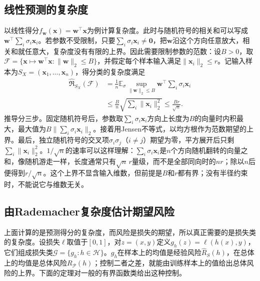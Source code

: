 \subsection{线性预测的复杂度}

以线性得分$f_{\bm w}(\bm x)=\bm w^\top\bm x$为例计算复杂度。此时与随机符号的相关和可以写成$\bm w^\top\sum_i\sigma_i\bm x_i$。若参数不受限制，只要$\sum_i\sigma_i\bm x_i\neq\bm 0$，把$\bm w$沿这个方向任意放大，相关和就任意大，复杂度没有有限的上界。因此需要限制参数的范数：设$B>0$，取$\mathcal F=\{\bm x\mapsto\bm w^\top\bm x:\|\bm w\|_2\leq B\}$，并假定每个样本输入满足$\|\bm x_i\|_2\leq r$。记输入样本为$S_X=(\bm x_1,\ldots,\bm x_n)$，得分类的复杂度满足
\begin{align}
 \widehat{\mathfrak R}_{S_X}(\mathcal F)
 &=\frac1n\mathbb E_\sigma\sup_{\lVert\bm{w}\rVert_2\leq B}
   \bm{w}^\top\sum_i\sigma_i \bm{x}_i\nonumber\\
 &\leq\frac{B}{n}\sqrt{\sum_i\lVert\bm{x}_i\rVert_2^2}
 \leq\frac{Br}{\sqrt n}.
 \label{eq:linear-rademacher-bound}
\end{align}
推导分三步。固定随机符号后，参数取$\sum_i\sigma_i\bm x_i$方向上长度为$B$的向量时内积最大，最大值为$B\|\sum_i\sigma_i\bm x_i\|_2$。接着用Jensen不等式，以均方根作为范数期望的上界。最后，独立随机符号的交叉项$\sigma_i\sigma_j$（$i\neq j$）期望为零，平方展开后只剩$\sum_i\|\bm x_i\|_2^2$。$1/\sqrt n$的速率可以这样理解：$\sum_i\sigma_i\bm x_i$是$n$个方向随机翻转的向量之和，像随机游走一样，长度通常只有$\sqrt n\,r$量级，而不是全部同向时的$nr$；除以$n$后便得到$r/\sqrt n$。这个上界不显含输入维数，但前提是$B$和$r$都有界；没有半径约束时，不能说它与维数无关。

\subsection{由Rademacher复杂度估计期望风险}

上面计算的是预测得分的复杂度，而风险是损失的期望，所以真正需要的是损失类的复杂度。设损失$\ell$取值于$[0,1]$，对$z=(x,y)$定义$g_h(z)=\ell(h(x),y)$，它们组成损失类$\mathcal G=\{g_h:h\in\mathcal H\}$。$g_h$在样本上的均值是经验风险$\hat R_S(h)$，在总体上的均值是总体风险$R_{\mathcal P}(h)$；控制二者之差，就能由训练样本上的值给出总体风险的上界。下面的定理对一般的有界函数类给出这种控制。

